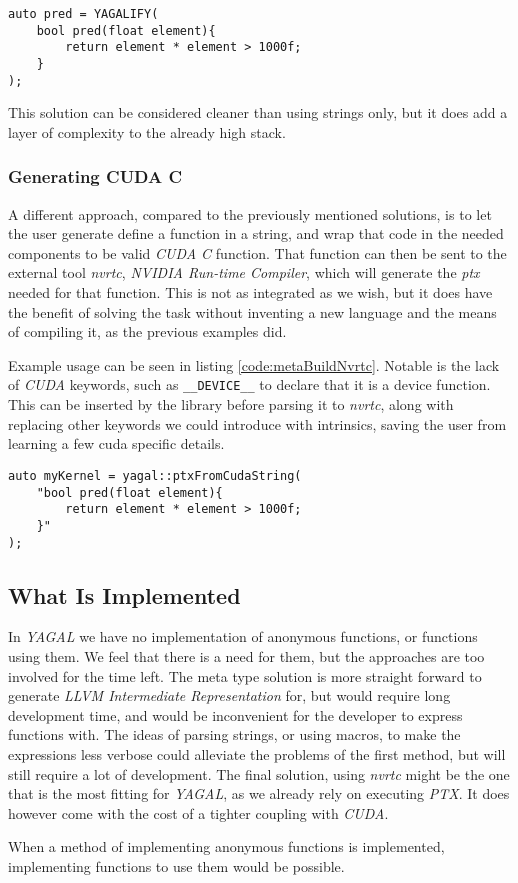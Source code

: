 \begin{lstlisting}[caption={Code showing possible construction of kernel with macro, named YAGALIFY, and c++ lambda.}, label={code:metaBuildMacro}]
auto pred = YAGALIFY(
    bool pred(float element){
        return element * element > 1000f;
    }
);
\end{lstlisting}

This solution can be considered cleaner than using strings only, but it does add a layer of complexity to the already high stack.

\subsubsection{Generating CUDA C}
A different approach, compared to the previously mentioned solutions, is to let the user generate define a function in a string, and wrap that code in the needed components to be valid \textit{CUDA C} function. That function can then be sent to the external tool \textit{nvrtc}\cite{nvrtcDoc}, \textit{NVIDIA Run-time Compiler}, which will generate the \textit{ptx} needed for that function. This is not as integrated as we wish, but it does have the benefit of solving the task without inventing a new language and the means of compiling it, as the previous examples did.

Example usage can be seen in listing \ref{code:metaBuildNvrtc}. Notable is the lack of \textit{CUDA} keywords, such as \texttt{\_\_DEVICE\_\_} to declare that it is a device function. This can be inserted by the library before parsing it to \textit{nvrtc}, along with replacing other keywords we could introduce with intrinsics, saving the user from learning a few cuda specific details.

\begin{lstlisting}[caption={Code showing possible construction of kernel with a string, being sent to the library, where it get extended to correct \textit{CUDA C}, before being sent to \textit{nvrtc}.}, label={code:metaBuildNvrtc}]
auto myKernel = yagal::ptxFromCudaString(
    "bool pred(float element){
        return element * element > 1000f;
    }"
);
\end{lstlisting}

\subsection{What Is Implemented}
In \textit{YAGAL} we have no implementation of anonymous functions, or functions using them. We feel that there is a need for them, but the approaches are too involved for the time left. The meta type solution is more straight forward to generate \textit{LLVM Intermediate Representation} for, but would require long development time, and would be inconvenient for the developer to express functions with. The ideas of parsing strings, or using macros, to make the expressions less verbose could alleviate the problems of the first method, but will still require a lot of development. The final solution, using \textit{nvrtc} might be the one that is the most fitting for \textit{YAGAL}, as we already rely on executing \textit{PTX}. It does however come with the cost of a tighter coupling with \textit{CUDA}.

When a method of implementing anonymous functions is implemented, implementing functions to use them would be possible.